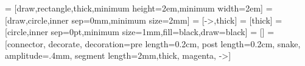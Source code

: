 

 = [draw,rectangle,thick,minimum height=2em,minimum width=2em]
 = [draw,circle,inner sep=0mm,minimum size=2mm]
 = [->,thick]
 = [thick]
 = [circle,inner sep=0pt,minimum size=1mm,fill=black,draw=black]
 = []
 = [connector, decorate, decoration={pre length=0.2cm,
                         post length=0.2cm, snake, amplitude=.4mm,
                         segment length=2mm},thick, magenta, ->]

\renewcommand{\vec}[1]{\ensuremath{\boldsymbol{#1}}} %
\def \myneq {\skew{-2}\not =} %


